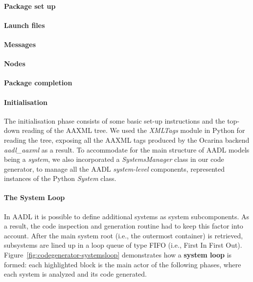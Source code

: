 \paragraph{Package set up}

\paragraph{Launch files}

\paragraph{Messages}

\paragraph{Nodes}

\paragraph{Package completion}



\paragraph{Initialisation} The initialisation phase consists of some basic set-up instructions and the top-down reading of the AAXML tree. We used the \textit{XMLTags} module in Python for reading the tree, exposing all the AAXML tags produced by the Ocarina backend \textit{aadl\_aaxml} as a result. %
To accommodate for the main structure of AADL models being a \textit{system}, we also incorporated a \textit{SystemsManager} class in our code generator, to manage all the AADL \textit{system-level} components, represented instances of the Python \textit{System} class.

\paragraph{The System Loop} In AADL it is possible to define additional systems as system subcomponents. As a result, the code inspection and generation routine had to keep this factor into account. After the main system root (i.e., the outermost container) is retrieved, subsystems are lined up in a loop queue of type FIFO (i.e., First In First Out). Figure~\ref{fig:codegenerator-systemsloop} demonstrates how a \textbf{system loop} is formed: each highlighted block is the main actor of the following phases, where each system is analyzed and its code generated.

